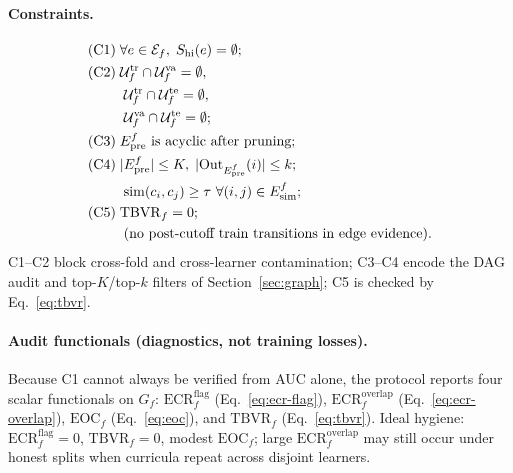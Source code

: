 \documentclass[runningheads]{llncs}
\newcommand{\Epre}{\ensuremath{E_{\text{pre}}}}
\newcommand{\Esim}{\ensuremath{E_{\text{sim}}}}
\begin{document}
\paragraph{Constraints.}
\begin{align}
\text{(C1)} \;& \forall e\in\mathcal{E}_f,\;
  S_{\mathrm{hi}}(e)=\emptyset;
  \label{eq:c1}\\
\text{(C2)} \;& \mathcal{U}^{\mathrm{tr}}_f \cap \mathcal{U}^{\mathrm{va}}_f
  = \emptyset,\notag\\
&\; \mathcal{U}^{\mathrm{tr}}_f \cap \mathcal{U}^{\mathrm{te}}_f
  = \emptyset,\notag\\
&\; \mathcal{U}^{\mathrm{va}}_f \cap \mathcal{U}^{\mathrm{te}}_f
  = \emptyset;
  \label{eq:c2}\\
\text{(C3)} \;& \Epre^f \text{ is acyclic after pruning};
  \label{eq:c3}\\
\text{(C4)} \;& |\Epre^f|\le K,\;
  |\mathrm{Out}_{\Epre^f}(i)|\le k;\notag\\
&\; \mathrm{sim}(c_i,c_j)\ge\tau \ \forall (i,j)\in\Esim^f;
  \label{eq:c4}\\
\text{(C5)} \;& \mathrm{TBVR}_f = 0;\notag\\
&\;\text{(no post-cutoff train transitions in edge evidence).}
  \label{eq:c5}
\end{align}
C1--C2 block cross-fold and cross-learner contamination; C3--C4 encode
the DAG audit and top-$K$/top-$k$ filters of Section~\ref{sec:graph};
C5 is checked by Eq.~\eqref{eq:tbvr}.

\paragraph{Audit functionals (diagnostics, not training losses).}
Because C1 cannot always be verified from AUC alone, the protocol
reports four scalar functionals on $G_f$:
$\mathrm{ECR}^{\mathrm{flag}}_f$ (Eq.~\eqref{eq:ecr-flag}),
$\mathrm{ECR}^{\mathrm{overlap}}_f$ (Eq.~\eqref{eq:ecr-overlap}),
$\mathrm{EOC}_f$ (Eq.~\eqref{eq:eoc}), and
$\mathrm{TBVR}_f$ (Eq.~\eqref{eq:tbvr}).
Ideal hygiene: $\mathrm{ECR}^{\mathrm{flag}}_f{=}0$,
$\mathrm{TBVR}_f{=}0$, modest $\mathrm{EOC}_f$; large
$\mathrm{ECR}^{\mathrm{overlap}}_f$ may still occur under honest splits
when curricula repeat across disjoint learners.
\end{document}
